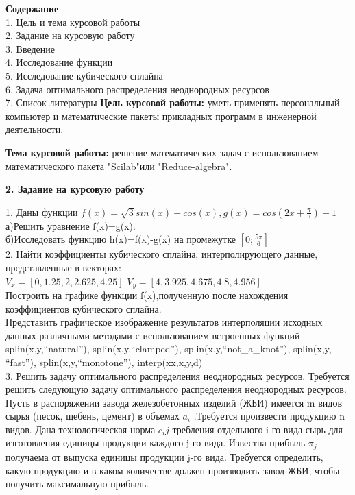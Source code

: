 \documentclass[russian,utf8,nocolumnxxxi,nocolumnxxxii]{eskdtext}
\begin{document}
{\normalsize{\bf{Содержание}}
\\1. Цель и тема курсовой работы
\\2. Задание на курсовую работу
\\3. Введение
\\4. Исследование функции
\\5. Исследование кубического сплайна
\\6. Задача оптимального распределения неоднородных ресурсов
\\7. Список литературы
\newpage
\normalsize{\bf{Цель курсовой работы:}} уметь применять персональный компьютер и
математические пакеты прикладных программ в инженерной деятельности.
\par
\normalsize{\bf{Тема курсовой работы:}} решение математических задач с использованием
математического пакета "Scilab"или "Reduce-algebra".
\newpage
\begin{center}
 {\large\bf2. Задание на курсовую работу}
\end{center}
\normalsize1. Даны функции $f(x)=\sqrt{3}sin(x)+cos(x),g(x)=cos(2x+\frac{\pi}{3})-1$
\\а)Решить уравнение f(x)=g(x).
\\б)Исследовать функцию h(x)=f(x)-g(x) на промежутке $[0;\frac{5\pi}{6}]$
\\2. Найти коэффициенты кубического сплайна, интерполирующего данные, представленные в векторах:\\
$V_{x}=[0,1.25,2,2.625,4.25]$
$V_{y}=[4,3.925,4.675,4.8,4.956]$\\
Построить на графике функции f(x),полученную после нахождения коэффициентов кубического сплайна. \\
Представить графическое изображение результатов интерполяции исходных данных различными методами с использованием встроенных функций\\ splin(x,y,“natural”), splin(x,y,“clamped”), splin(x,y,“not\_a\_knot”), splin(x,y, “fast”), splin(x,y,“monotone”), interp(xx,x,y,d)\\
3. Решить задачу оптимального распределения неоднородных ресурсов.
Требуется решить следующую задачу оптимального распределения неоднородных ресурсов. Пусть в распоряжении завода железобетонных изделий (ЖБИ) имеется m видов сырья (песок, щебень, цемент) в объемах ${ a_i}$  .Требуется произвести продукцию { n} видов. Дана технологическая норма $c_ij$  требления отдельного i-го вида сырь для изготовления единицы продукции каждого j-го вида. Известна прибыль $\pi_j$  получаема от выпуска единицы продукции j-го вида. Требуется определить, какую продукцию и в каком количестве должен производить завод ЖБИ, чтобы получить максимальную прибыль.
}
\end{document}
